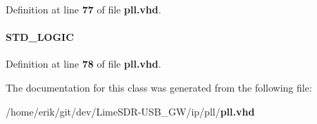 Definition at line {\bf 77} of file {\bf pll.\+vhd}.

\paragraph[{sub\+\_\+wire9}]{ {\bfseries \textcolor{comment}{S\+T\+D\+\_\+\+L\+O\+G\+IC}\textcolor{vhdlchar}{ }} \hspace{0.3cm}{\ttfamily [Signal]}}\label{classpll_1_1SYN_afb9987791dcdc8a6fcf5b1bcae35a592}


Definition at line {\bf 78} of file {\bf pll.\+vhd}.



The documentation for this class was generated from the following file\+:\begin{DoxyCompactItemize}
\item 
/home/erik/git/dev/\+Lime\+S\+D\+R-\/\+U\+S\+B\+\_\+\+G\+W/ip/pll/{\bf pll.\+vhd}\end{DoxyCompactItemize}
